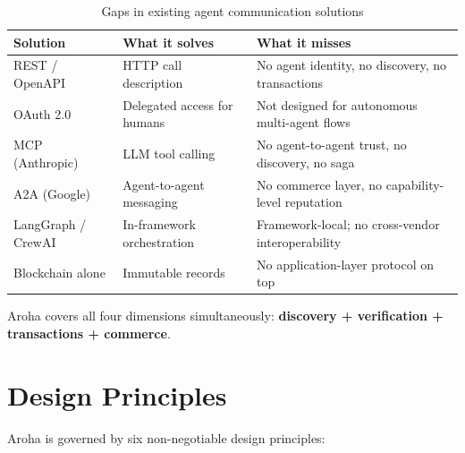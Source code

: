 \documentclass[11pt,a4paper]{article}
\begin{document}
\begin{table}[ht]
  \centering
  \renewcommand{\arraystretch}{1.4}
  \begin{tabularx}{\textwidth}{@{} l p{4.5cm} X @{}}
    \toprule
    \textbf{Solution} & \textbf{What it solves} & \textbf{What it misses} \\
    \midrule
    REST / OpenAPI      & HTTP call description       & No agent identity, no discovery, no transactions \\
    OAuth 2.0           & Delegated access for humans & Not designed for autonomous multi-agent flows \\
    MCP (Anthropic)     & LLM tool calling            & No agent-to-agent trust, no discovery, no saga \\
    A2A (Google)        & Agent-to-agent messaging    & No commerce layer, no capability-level reputation \\
    LangGraph / CrewAI  & In-framework orchestration  & Framework-local; no cross-vendor interoperability \\
    Blockchain alone    & Immutable records           & No application-layer protocol on top \\
    \bottomrule
  \end{tabularx}
  \caption{Gaps in existing agent communication solutions}
\end{table}

Aroha covers all four dimensions simultaneously:
\textbf{discovery + verification + transactions + commerce}.

\section{Design Principles}

Aroha is governed by six non-negotiable design principles:
\end{document}
